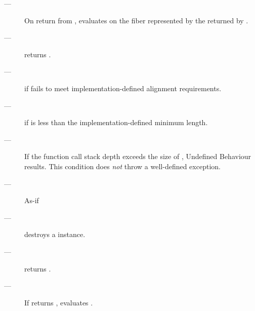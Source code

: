 \remarks
\begin{description}
    \item[---] On return from , evaluates  on the fiber represented by the 
               returned by .
\end{description}

\postcond
\begin{description}
    \item[---]  returns .
\end{description}

\except
\begin{description}
    \item[---]  if  fails to meet
               implementation-defined alignment requirements.
    \item[---]  if  is less than the
               implementation-defined minimum length.
\end{description}

\remarks
\begin{description}
    \item[---] If the function call stack depth exceeds the size
               of , Undefined Behaviour results. This condition
               does \emph{not} throw a well-defined exception.
\end{description}


\effects
\begin{description}
    \item[---] As-if 
\end{description}


\effects
\begin{description}
    \item[---] destroys a \fiber instance.
\end{description}

\precond
\begin{description}
    \item[---]  returns .
\end{description}

\effects
\begin{description}
    \item[---] If  returns , evaluates .
\end{description}

